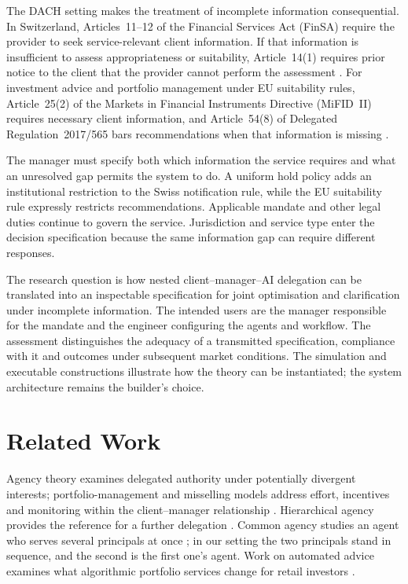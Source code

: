 \documentclass[oneside,10pt,english]{swissi}
\begin{document}
The DACH setting makes the treatment of incomplete information consequential. In Switzerland, Articles~11--12 of the Financial Services Act (FinSA) require the provider to seek service-relevant client information. If that information is insufficient to assess appropriateness or suitability, Article~14(1) requires prior notice to the client that the provider cannot perform the assessment \parencite[arts.~11--14]{switzerland2018finsa}. For investment advice and portfolio management under EU suitability rules, Article~25(2) of the Markets in Financial Instruments Directive (MiFID~II) requires necessary client information, and Article~54(8) of Delegated Regulation~2017/565 bars recommendations when that information is missing \parencites[art.~25(2)]{europeanunion2014mifidii}[art.~54(8)]{europeancommission2017suitability}.

The manager must specify both which information the service requires and what an unresolved gap permits the system to do. A uniform hold policy adds an institutional restriction to the Swiss notification rule, while the EU suitability rule expressly restricts recommendations. Applicable mandate and other legal duties continue to govern the service. Jurisdiction and service type enter the decision specification because the same information gap can require different responses.

The research question is how nested client--manager--AI delegation can be translated into an inspectable specification for joint optimisation and clarification under incomplete information. The intended users are the manager responsible for the mandate and the engineer configuring the agents and workflow. The assessment distinguishes the adequacy of a transmitted specification, compliance with it and outcomes under subsequent market conditions. The simulation and executable constructions illustrate how the theory can be instantiated; the system architecture remains the builder's choice.

\section{Related Work}\label{sec:related-work}

Agency theory examines delegated authority under potentially divergent interests; portfolio-management and misselling models address effort, incentives and monitoring within the client--manager relationship \parencite{jensen1976theory,holmstrom1979moral,stoughton1993moral,inderst2009misselling}. Hierarchical agency provides the reference for a further delegation \parencite{tirole1986hierarchies}. Common agency studies an agent who serves several principals at once \parencite{bernheim1986common}; in our setting the two principals stand in sequence, and the second is the first one's agent. Work on automated advice examines what algorithmic portfolio services change for retail investors \parencite{dacunto2019roboadvising}.
\end{document}
